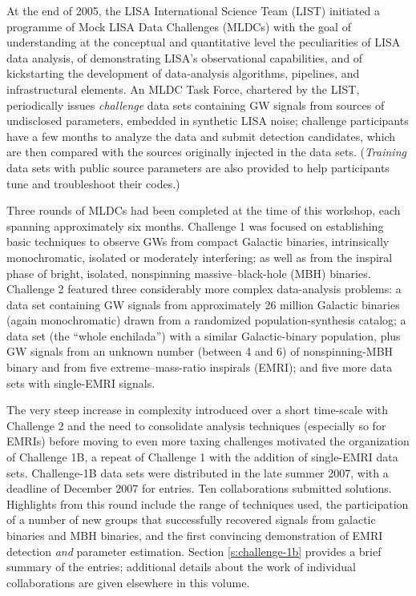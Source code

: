 \documentclass{iopart}
\begin{document}
At the end of 2005, the LISA International Science Team (LIST) initiated a programme of Mock LISA Data Challenges (MLDCs) with the goal of understanding at the conceptual and quantitative level the peculiarities of LISA data analysis, of demonstrating LISA's observational capabilities, and of kickstarting the development of data-analysis algorithms, pipelines, and infrastructural elements.
An MLDC Task Force, chartered by the LIST, periodically issues \emph{challenge} data sets containing GW signals from sources of undisclosed parameters, embedded in synthetic LISA noise; challenge participants have a few months to analyze the data and submit detection candidates, which are then compared with the sources originally injected in the data sets. (\emph{Training} data sets with public source parameters are also provided to help participants tune and troubleshoot their codes.)

Three rounds of MLDCs had been completed at the time of this workshop, each spanning approximately six months. Challenge 1 \cite{mldclisasymp,mldcgwdaw1} was focused on establishing basic techniques to observe GWs from compact Galactic binaries, intrinsically monochromatic, isolated or moderately interfering; as well as from the inspiral phase of bright, isolated, nonspinning massive--black-hole (MBH) binaries. Challenge 2 \cite{mldcgwdaw2,mldcamaldi2} featured three considerably more complex data-analysis problems: a data set containing GW signals from approximately 26 million Galactic binaries (again monochromatic) drawn from a randomized population-synthesis catalog; a data set (the ``whole enchilada'') with a similar Galactic-binary population, plus GW signals from an unknown number (between 4 and 6) of nonspinning-MBH binary and from five extreme--mass-ratio inspirals (EMRI); and five more data sets with single-EMRI signals.

The very steep increase in complexity introduced over a short time-scale with Challenge 2 and the need to consolidate analysis techniques  (especially so for EMRIs) before moving to even more taxing challenges motivated the organization of Challenge 1B, a repeat of Challenge 1 with the addition of single-EMRI data sets. Challenge-1B data sets were distributed in the late summer 2007, with a deadline of December 2007 for entries. Ten collaborations submitted solutions. Highlights from this round include the range of techniques used, the participation of a number of new groups that successfully recovered signals from galactic binaries and MBH binaries, and the first convincing demonstration of EMRI detection \emph{and} parameter estimation. Section \ref{s:challenge-1b} provides a brief summary of the entries; additional details about the work of individual collaborations are given elsewhere in this volume.
\end{document}
